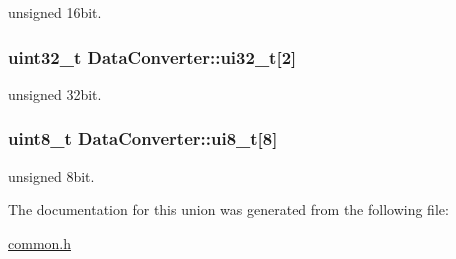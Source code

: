 unsigned 16bit. 

\hypertarget{union_data_converter_a20845be2f89b1012e3942dca4c5fa117}{
\subsubsection[{ui32\-\_\-t}]{\setlength{\rightskip}{0pt plus 5cm}uint32\-\_\-t Data\-Converter\-::ui32\-\_\-t\mbox{[}2\mbox{]}}}\label{union_data_converter_a20845be2f89b1012e3942dca4c5fa117}


unsigned 32bit. 

\hypertarget{union_data_converter_a6576e61c59bc9d4e1b54f881fe5acdd4}{
\subsubsection[{ui8\-\_\-t}]{\setlength{\rightskip}{0pt plus 5cm}uint8\-\_\-t Data\-Converter\-::ui8\-\_\-t\mbox{[}8\mbox{]}}}\label{union_data_converter_a6576e61c59bc9d4e1b54f881fe5acdd4}


unsigned 8bit. 



The documentation for this union was generated from the following file\-:\begin{DoxyCompactItemize}
\item 
\hyperlink{common_8h}{common.\-h}\end{DoxyCompactItemize}
